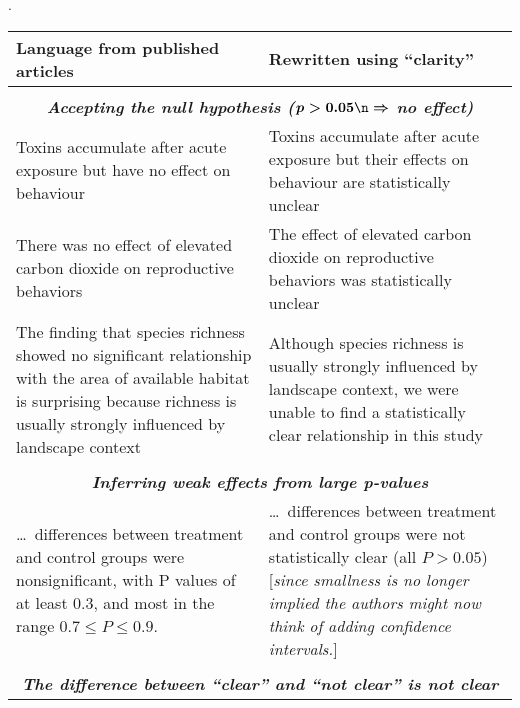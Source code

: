 \documentclass[12pt, english, dvipsnames, table]{article} %
\newcommand{\pvals}{p-values\xspace}
\begin{document}
\newcommand{\ourcomment}[1]{[\emph{#1}]}
\begin{table}
\setlength\tabcolsep{1cm}.
\begin{tabular}{p{7.0cm}p{7.0cm}}
\textbf{Language from published articles} & \textbf{Rewritten using ``clarity''} \\
\hline\\

\multicolumn{2}{c}{\emph{\textbf{Accepting the null hypothesis ($\boldsymbol{p > 0.05 \n\Rightarrow}$ no effect)}}} \\
\hline

Toxins accumulate after acute exposure but have no effect on behaviour
& Toxins accumulate after acute exposure but their effects on behaviour are statistically unclear
\\

\rowcolor{vlg}
There was no effect of elevated carbon dioxide on reproductive behaviors 
& The effect of elevated carbon dioxide on reproductive behaviors was statistically unclear
\\

The finding that species richness showed no significant relationship with the area of available habitat is surprising because richness is usually strongly influenced by landscape context 
& Although species richness is usually strongly influenced by landscape context, we were unable to find a statistically clear relationship in this study
\\ \\

\multicolumn{2}{c}{\emph{\textbf{Inferring weak effects from large \pvals}} \citep{WassersteinandLazar2016}}
\\
\hline
\ldots\ differences between treatment and control groups were nonsignificant, with P values of at least 0.3, and most in the range $0.7 \leq P \leq 0.9$.
& \ldots\ differences between treatment and control groups were not statistically clear (all $P > 0.05$) \ourcomment{since smallness is no longer implied the authors might now think of adding confidence intervals.}
\\ \\

\multicolumn{2}{c}{\emph{\textbf{The difference between ``clear'' and ``not clear'' is not clear}} \citep{GelmanandStern2006}}
\\
\hline


\end{tabular}
\end{table}
\end{document}
